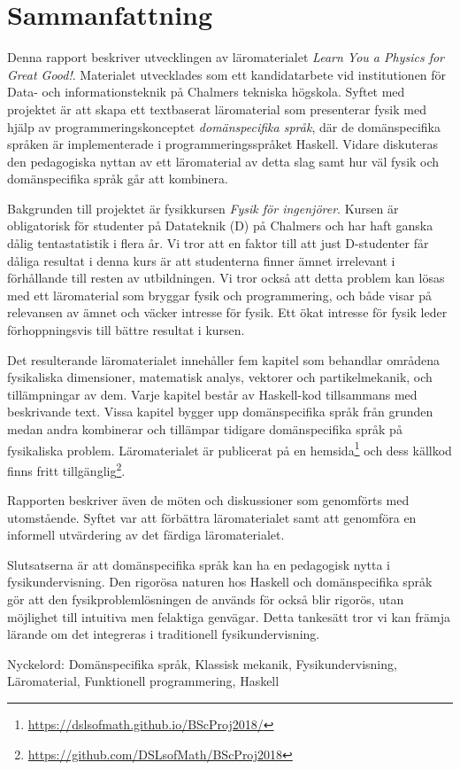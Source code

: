 
\thispagestyle{plain}			%

\section*{Sammanfattning}

Denna rapport beskriver utvecklingen av läromaterialet \textit{Learn You a
Physics for Great Good!}. Materialet utvecklades som ett kandidatarbete vid
institutionen för Data- och informationsteknik på Chalmers tekniska högskola.
Syftet med projektet är att skapa ett textbaserat läromaterial som presenterar
fysik med hjälp av programmeringskonceptet \textit{domänspecifika språk}, där de
domänspecifika språken är implementerade i programmeringsspråket Haskell. Vidare
diskuteras den pedagogiska nyttan av ett läromaterial av detta slag samt hur
väl fysik och domänspecifika språk går att kombinera.

Bakgrunden till projektet är fysikkursen \textit{Fysik för ingenjörer}. Kursen
är obligatorisk för studenter på Datateknik (D) på Chalmers och har haft ganska
dålig tentastatistik i flera år. Vi tror att en faktor till att just D-studenter
får dåliga resultat i denna
kurs är att studenterna finner ämnet irrelevant i förhållande till
resten av utbildningen. Vi tror också att detta problem kan lösas med ett
läromaterial som bryggar fysik och
programmering, och både visar på relevansen av ämnet och väcker
intresse för fysik. Ett ökat intresse för fysik leder förhoppningsvis
till bättre resultat i kursen.

Det resulterande läromaterialet innehåller fem kapitel som
behandlar områdena fysikaliska dimensioner, matematisk analys,
vektorer och partikelmekanik, och tillämpningar av dem. Varje kapitel
består av Haskell-kod tillsammans med beskrivande
text. Vissa kapitel bygger upp domänspecifika språk från grunden medan
andra kombinerar och tillämpar tidigare domänspecifika språk på
fysikaliska problem. Läromaterialet är publicerat på en
hemsida\footnote{\url{https://dslsofmath.github.io/BScProj2018/}} och dess
källkod finns fritt
tillgänglig\footnote{\url{https://github.com/DSLsofMath/BScProj2018}}.

Rapporten beskriver
även de möten och diskussioner som genomförts med utomstående. Syftet var att
förbättra läromaterialet samt att genomföra en informell utvärdering av det
färdiga läromaterialet.

Slutsatserna är att
domänspecifika språk kan ha en pedagogisk nytta i
fysikundervisning. Den
rigorösa naturen hos Haskell och domänspecifika språk gör att
den fysikproblemlösningen de används för också blir
rigorös, utan möjlighet till intuitiva men felaktiga
genvägar. Detta tankesätt tror vi kan främja lärande om det integreras i
traditionell fysikundervisning.

\vfill
Nyckelord: Domänspecifika språk, Klassisk mekanik, Fysikundervisning, Läromaterial, Funktionell programmering, Haskell

\newpage				%
\thispagestyle{empty}
\mbox{}
